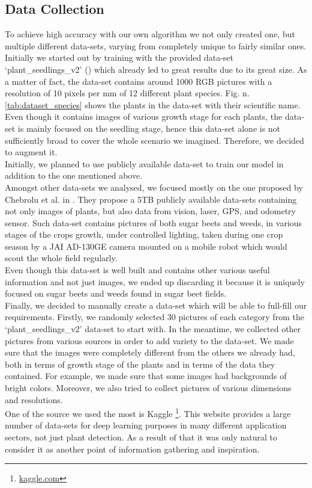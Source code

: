 \documentclass[english]{lni}
\begin{document}
\subsection{Data Collection}
To achieve high accuracy with our own algorithm we not only created one, but multiple different data-sets, varying from completely unique to fairly similar ones.\\
Initially we started out by training with the provided data-set ‘plant\_seedlings\_v2’ (\cite{giselsson2017public}) which already led to great results due to its great size. As a matter of fact, the data-set contains around 1000 RGB pictures with a resolution of 10 pixels per mm of 12 different plant species. Fig. n. \ref{tab:dataset_species} shows the plants in the data-set with their scientific name. \\
Even though it contains images of various growth stage for each plants, the data-set is mainly focused on the seedling stage, hence this data-set alone is not sufficiently broad to cover the whole scenario we imagined. Therefore, we decided to augment it.\\
Initially, we planned to use publicly available data-set to train our model in addition to the one mentioned above. \\
Amongst other data-sets we analysed, we focused mostly on the one proposed by Chebrolu et al. in \cite{chebrolu2017ijrr}. They propose a 5TB publicly available data-sets containing not only images of plants, but also data from vision, laser, GPS, and odometry sensor. Such data-set contains pictures of both sugar beets and weeds, in various stages of the crops growth, under controlled lighting, taken during one crop season by a JAI AD-130GE camera mounted on a mobile robot which would scout the whole field regularly.\\
Even though this data-set is well built and contains other various useful information and not just images, we ended up discarding it because it is uniquely focused on sugar beets and weeds found in sugar beet fields.  \\
Finally, we decided to manually create a data-set which will be able to full-fill our requirements. Firstly, we randomly selected 
30 pictures of each category from the ‘plant\_seedlings\_v2’ data-set to start with. In the meantime, we collected other pictures from various sources in order to add variety to the data-set. We made sure that the images were completely different from the others we already had, both in terms of growth stage of the plants and in terms of the data they contained. For example, we made sure that some images had backgrounds of bright colors. Moreover, we also tried to collect pictures of various dimensions and resolutions. \\
One of the source we used the most is Kaggle \footnote{\url{kaggle.com}}. This website provides a large number of data-sets for deep learning purposes in many different application sectors, not just plant detection. As a result of that it was only natural to consider it as another point of information gathering and inspiration.
\end{document}
